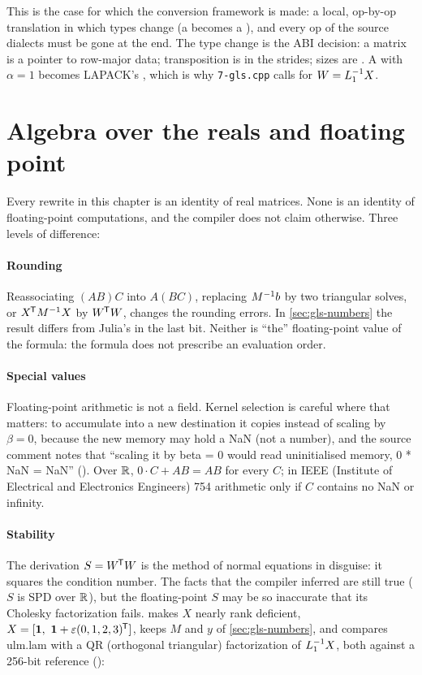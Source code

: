 This is the case for which the conversion framework is made: a local,
op-by-op translation in which types change (a 
becomes a ), and every op of the source dialects must be
gone at the end. The type change is the ABI decision: a matrix is a pointer
to row-major data; transposition is in the strides; sizes are
. A  with \(\alpha = 1\) becomes LAPACK's
, which is why \texttt{7-gls.cpp} calls  for \(W =
L_1^{-1} X\).

\section{Algebra over the reals and floating point}
\label{sec:kernels-fp}

Every rewrite in this chapter is an identity of real matrices. None is an
identity of floating-point computations, and the compiler does not claim
otherwise. Three levels of difference:

\paragraph{Rounding} Reassociating \((AB)C\) into \(A(BC)\), replacing
\(M^{-1} b\) by two triangular solves, or \(X^{\mkern-1.5mu\mathsf{T}} M^{-1} X\) by \(W^{\mkern-1.5mu\mathsf{T}} W\),
changes the rounding errors. In \cref{sec:gls-numbers} the result differs
from Julia's in the last bit. Neither is ``the'' floating-point value of
the formula: the formula does not prescribe an evaluation order.

\paragraph{Special values} Floating-point arithmetic is not a field.
Kernel selection is careful where that matters: to accumulate into a new
destination it copies instead of scaling by \(\beta = 0\), because the new
memory may hold a NaN (not a number), and the source comment notes that
``scaling it by beta = 0 would read uninitialised memory, 0 * NaN = NaN''
(). Over \(\mathbb{R}\), \(0\cdot C + AB =
AB\) for every \(C\); in IEEE (Institute of Electrical and Electronics
Engineers) 754 arithmetic only if \(C\) contains no NaN or
infinity.

\paragraph{Stability} The derivation \(S = W^{\mkern-1.5mu\mathsf{T}} W\) is the method of normal
equations in disguise: it squares the condition number. The facts that the
compiler inferred are still true (\(S\) is SPD over \(\mathbb{R}\)), but the
floating-point \(S\) may be so inaccurate that its Cholesky factorization
fails.  makes \(X\) nearly rank deficient,
\(X = [\mathbf{1},\ \mathbf{1} + \varepsilon(0,1,2,3)\T]\), keeps \(M\) and
\(y\) of \cref{sec:gls-numbers}, and compares ulm.lam with a QR (orthogonal
triangular) factorization of \(L_1^{-1} X\), both against a 256-bit reference
():

